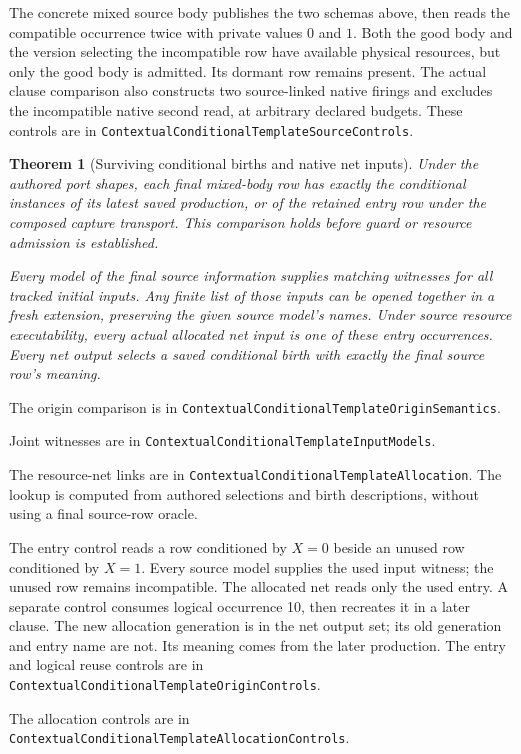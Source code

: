\documentclass[11pt]{article}
\newtheorem{theorem}{Theorem}
\newcommand{\code}[1]{\texttt{\small #1}}
\begin{document}
The concrete mixed source body publishes the two schemas above, then reads
the compatible occurrence twice with private values $0$ and $1$. Both the
good body and the version selecting the incompatible row have available
physical resources, but only the good body is admitted. Its dormant row
remains present. The actual clause comparison also constructs two
source-linked native firings and excludes the incompatible native second
read, at arbitrary declared budgets. These controls are in
\code{ContextualConditionalTemplateSourceControls}.

\begin{theorem}[Surviving conditional births and native net inputs]
Under the authored port shapes, each final mixed-body row has exactly the
conditional instances of its latest saved production, or of the retained
entry row under the composed capture transport. This comparison holds
before guard or resource admission is established.

Every model of the final source information supplies matching witnesses
for all tracked initial inputs. Any finite list of those inputs can be
opened together in a fresh extension, preserving the given source model's
names. Under source resource executability, every actual allocated net
input is one of these entry occurrences. Every net output selects a saved
conditional birth with exactly the final source row's meaning.
\end{theorem}
The origin comparison is in
\code{ContextualConditionalTemplateOriginSemantics}.

Joint witnesses are in \code{ContextualConditionalTemplateInputModels}.

The resource-net links are in
\code{ContextualConditionalTemplateAllocation}.
The lookup is computed from authored selections and birth descriptions,
without using a final source-row oracle.

The entry control reads a row conditioned by $X=0$ beside an unused row
conditioned by $X=1$. Every source model supplies the used input witness;
the unused row remains incompatible. The allocated net reads only the
used entry. A separate control consumes logical occurrence 10, then
recreates it in a later clause. The new allocation generation is in the
net output set; its old generation and entry name are not. Its meaning
comes from the later production. The entry and logical reuse controls are
in \code{ContextualConditionalTemplateOriginControls}.

The allocation controls are in
\code{ContextualConditionalTemplateAllocationControls}.
\end{document}
